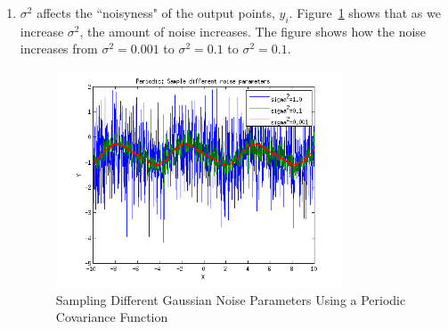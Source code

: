 \documentclass{article}
\begin{document}
\begin{enumerate}[label=(\alph*)]
\item $\sigma^2$ affects the ``noisyness" of the output points, $y_i$.
Figure~\ref{fig:1b} shows that as we increase $\sigma^2$, the amount of noise increases. The figure shows
how the noise increases from $\sigma^2=0.001$ to $\sigma^2 = 0.1$ to $\sigma^2=0.1$.

\begin{figure}[H]
\centering
\includegraphics[width=0.8\textwidth]{1_b.png}
\caption{Sampling Different Gaussian Noise Parameters Using a Periodic Covariance Function}
\label{fig:1b}
\end{figure}


\end{enumerate}
\end{document}

